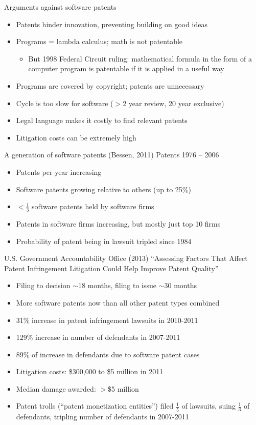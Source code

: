 \documentclass{beamer}
\begin{document}
\begin{frame}{Arguments against software patents}
\begin{itemize}
\item Patents hinder innovation, preventing building on good ideas
\item Programs = lambda calculus; math is not patentable
\begin{itemize}
\item But 1998 Federal Circuit ruling: mathematical formula in the form of a 
computer program is patentable if it is applied in a useful way
\end{itemize}
\item Programs are covered by copyright; patents are unnecessary
\item Cycle is too slow for software ($>$2 year review, 20 year exclusive)
\item Legal language makes it costly to find relevant patents
\item Litigation costs can be extremely high
\end{itemize}
\end{frame}

\begin{frame}{A generation of software patents (Bessen, 2011)}
Patents 1976 -- 2006
\begin{itemize}
\item Patents per year increasing
\item Software patents growing relative to others (up to 25\%)
\item $<$$\frac{1}{3}$ software patents held by software firms
\item Patents in software firms increasing, but mostly just top 10 firms
\item Probability of patent being in lawsuit tripled since 1984
\end{itemize}
\end{frame}

\begin{frame}{U.S. Government Accountability Office (2013)}
``Assessing Factors That Affect Patent Infringement Litigation Could Help Improve Patent Quality''
\begin{itemize}
\item Filing to decision $\sim$18 months, filing to issue $\sim$30 months
\item More software patents now than all other patent types combined
\item 31\% increase in patent infringement lawsuits in 2010-2011
\item 129\% increase in number of defendants in 2007-2011
\item 89\% of increase in defendants due to software patent cases
\item Litigation costs: \$300,000 to \$5 million in 2011
\item Median damage awarded: $>$\$5 million
\item Patent trolls (``patent monetization entities'') filed $\frac{1}{5}$ of lawsuits, suing $\frac{1}{3}$ of defendants, tripling number of defendants in 2007-2011
\end{itemize}
\bigskip
\centering
\href{http://www.gao.gov/assets/660/657103.pdf}{}
\end{frame}
\end{document}
